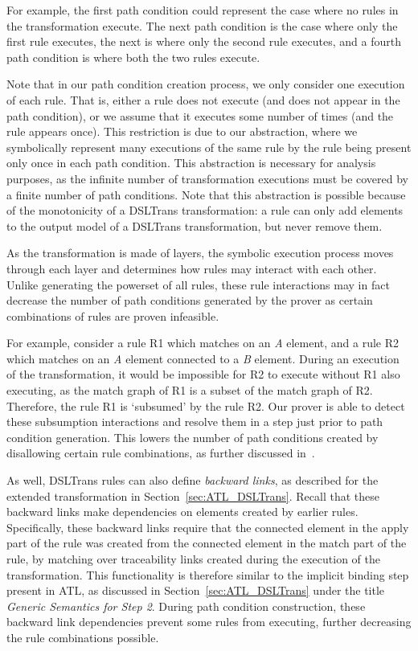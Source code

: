 For example, the first path
condition could represent the case where no rules in the transformation execute.
The next path condition is the case where only the first rule executes, the next
is where only the second rule executes, and a fourth path condition is where
both the two rules execute.

Note that in our path condition creation process, we
only consider one execution of each rule. That is, either a rule does not
execute (and does not appear in the path condition), or we assume that it executes some number of times (and the rule appears once). This restriction is due to our abstraction, where we symbolically represent
many executions of the same rule by the rule being present only once in each path
condition. This abstraction is necessary for analysis purposes, as the infinite number of transformation executions must be covered by a finite number of path conditions. Note that this abstraction is possible because of the
monotonicity of a DSLTrans transformation: a rule can only add elements to the
output model of a DSLTrans transformation, but never remove them.

As the transformation is made of layers, the symbolic execution process moves
through each layer and determines how rules may interact with each other. Unlike generating the powerset of all rules, these
rule interactions may in fact decrease the number of path conditions generated
by the prover as certain combinations of rules are proven infeasible.

For example, consider a rule R1 which matches on an \textit{A} element, and a
rule R2 which matches on an \textit{A} element connected to a \textit{B}
element. During an execution of the transformation, it would be impossible for R2 to execute without R1 also executing, as the match graph of R1 is a subset of the match graph of R2. Therefore, the rule R1 is `subsumed' by the rule R2. Our prover is able to detect these subsumption interactions and resolve them in a step just prior to path condition generation. This lowers the number of path conditions created by disallowing certain rule combinations, as further discussed in~\cite{Selim2014}.

As well, DSLTrans rules can also define \textit{backward links}, as described for the extended \FTP transformation in Section~\ref{sec:ATL_DSLTrans}. Recall that these backward links make dependencies on elements created by earlier rules. Specifically, these backward links require that the connected element in the
apply part of the rule was created from the connected element in the match part of the rule, by matching over traceability links created during the execution of the transformation. This functionality is therefore similar to the implicit binding step present in ATL, as discussed in Section~\ref{sec:ATL_DSLTrans} under the title \textit{Generic Semantics for Step 2}. During path condition construction, these backward link dependencies prevent some rules from executing, further decreasing the rule combinations possible.


